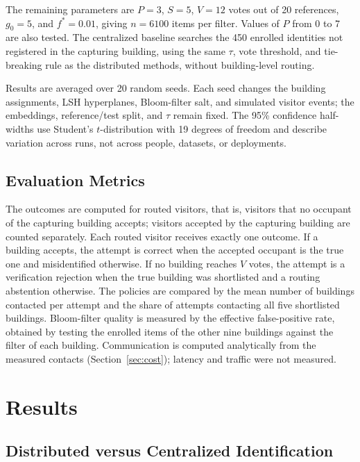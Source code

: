\documentclass[pdflatex,sn-mathphys-num]{sn-jnl}%
\theoremstyle{thmstyleone}%
\theoremstyle{thmstyletwo}%
\theoremstyle{thmstylethree}%
\begin{document}
The remaining parameters are $P=3$, $S=5$, $V=12$ votes out of 20 references, $g_0=5$, and $f^*=0.01$, giving $n=6100$ items per filter. Values of $P$ from 0 to 7 are also tested. The centralized baseline searches the 450 enrolled identities not registered in the capturing building, using the same $\tau$, vote threshold, and tie-breaking rule as the distributed methods, without building-level routing.

Results are averaged over 20 random seeds. Each seed changes the building assignments, LSH hyperplanes, Bloom-filter salt, and simulated visitor events; the embeddings, reference/test split, and $\tau$ remain fixed. The 95\% confidence half-widths use Student's $t$-distribution with 19 degrees of freedom and describe variation across runs, not across people, datasets, or deployments.


\subsection{Evaluation Metrics}

The outcomes are computed for routed visitors, that is, visitors that no occupant of the capturing building accepts; visitors accepted by the capturing building are counted separately. Each routed visitor receives exactly one outcome. If a building accepts, the attempt is correct when the accepted occupant is the true one and misidentified otherwise. If no building reaches $V$ votes, the attempt is a verification rejection when the true building was shortlisted and a routing abstention otherwise. The policies are compared by the mean number of buildings contacted per attempt and the share of attempts contacting all five shortlisted buildings. Bloom-filter quality is measured by the effective false-positive rate, obtained by testing the enrolled items of the other nine buildings against the filter of each building. Communication is computed analytically from the measured contacts (Section~\ref{sec:cost}); latency and traffic were not measured.


\section{Results}
\label{sec:results}

\subsection{Distributed versus Centralized Identification}
\end{document}
